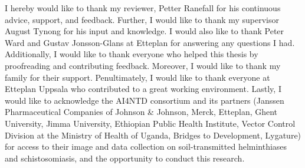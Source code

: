 I hereby would like to thank my reviewer, Petter Ranefall for his continuous advice, support, and feedback. Further, I would like to thank my supervisor August Tynong for his input and knowledge. I would also like to thank Peter Ward and Gustav Jonsson-Glans at Etteplan for answering any questions I had. Additionally, I would like to thank everyone who helped this thesis by proofreading and contributing feedback. Moreover, I would like to thank my family for their support. Penultimately, I would like to thank everyone at Etteplan Uppsala who contributed to a great working environment. Lastly, I would like to acknowledge the AI4NTD consortium and its partners (Janssen Pharmaceutical Companies of Johnson \& Johnson, Merck, Etteplan, Ghent University, Jimma University, Ethiopian Public Health Institute, Vector Control Division at the Ministry of Health of Uganda, Bridges to Development, Lygature) for access to their image and data collection on soil-transmitted helminthiases and schistosomiasis, and the opportunity to conduct this research.
